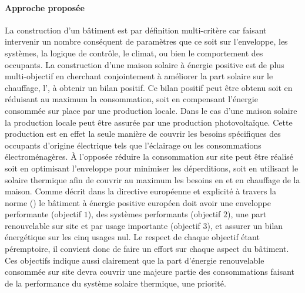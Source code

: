 \paragraph{Approche proposée} %
\label{par:approche_proposee}
La construction d’un bâtiment est par définition multi-critère car faisant intervenir
un nombre conséquent de paramètres que ce soit sur l’enveloppe, les systèmes, la logique
de contrôle, le climat, ou bien le comportement des occupants.
La construction d’une maison solaire à énergie positive est de plus multi-objectif
en cherchant conjointement à améliorer la part solaire sur le chauffage, l’,
à obtenir un bilan positif. Ce bilan positif peut être obtenu soit en réduisant au
maximum la consommation, soit en compensant l’énergie consommée sur place par une production locale.
Dans le cas d’une maison solaire la production locale peut être assurée par une production
photovoltaïque. Cette production est en effet la seule manière de couvrir les besoins
spécifiques des occupants d’origine électrique tels que l’éclairage ou les consommations
électroménagères. À l’opposée réduire la consommation sur site peut être réalisé
soit en optimisant l’enveloppe pour minimiser les déperditions, soit en utilisant
le solaire thermique afin de couvrir au maximum les besoins en  et en chauffage
de la maison.
Comme décrit dans la directive européenne \parencite{EPBD2010} et explicité à travers
la norme  () le bâtiment à énergie positive européen
doit avoir une enveloppe performante (objectif $1$), des systèmes performants (objectif $2$),
une part renouvelable sur site et par usage importante (objectif $3$), et assurer un
bilan énergétique sur les cinq usages nul.
Le respect de chaque objectif étant péremptoire, il convient donc de faire un effort
sur chaque aspect du bâtiment. Ces objectifs indique aussi clairement que la part
d’énergie renouvelable consommée sur site devra couvrir une majeure partie des
consommations faisant de la performance du système solaire thermique, une priorité.

